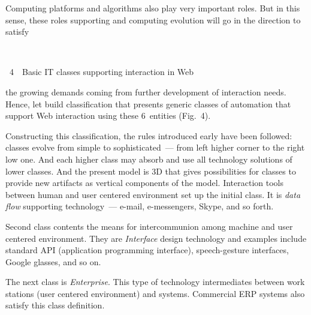 \begin{multicols}{2}
 Computing platforms and algorithms also play very important roles. But in this
 sense,
  these roles supporting and computing evolution will go in the direction
  to satisfy\linebreak\vspace*{-12pt}

  \pagebreak



 \begin{center}
 \vspace*{1pt}
 \mbox{%
 \epsfxsize=77.459mm
 }

 {{\figurename~4}\ \ \small{Basic IT classes supporting interaction in Web}}
  \end{center}

  \vspace*{6pt}

\addtocounter{figure}{1}

  \noindent
   the growing demands coming from
further development of interaction needs. Hence, let build classification that presents generic classes of
automation that support Web interaction using these 6~entities (Fig.~4).

\addtocounter{figure}{1}



 Constructing this classification, the rules introduced early have
 been followed: classes evolve from simple to
sophisticated~--- from left higher corner to the
right low one. And each higher class may absorb and use all
technology solutions of lower classes. And the present model is 3D that gives possibilities for classes to provide
new artifacts as vertical components of the model. Interaction tools between human and
user centered
environment set up the initial class. It is \textit{data flow} supporting technology~--- e-mail, e-messengers,
Skype, and so forth.

 Second class contents the means for intercommunion among machine and user centered environment.
They are \textit{Interface} design technology and examples include standard API
(application programming interface), speech-gesture
interfaces, Google glasses, and so on.

 The next class is \textit{Enterprise}. This type of technology intermediates between work stations (user
centered environment) and systems. Commercial ERP systems also satisfy this class definition.


\end{multicols}
